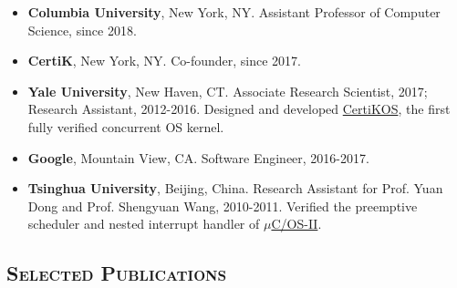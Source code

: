\documentclass[10pt]{article}
\renewcommand{\section}[1]{
	\vspace{-5pt}
   	\subsection*{\scshape  \bfseries #1}
   }
\newenvironment{innerlist}[1][\enskip\textbullet]%
        {\begin{itemize}[#1,leftmargin=25pt,parsep=0pt,itemsep=2pt,topsep=2pt,partopsep=0pt]}
        {\end{itemize}}
\newcommand\columbia{\textbf{Columbia University}}
\newcommand\yale{\textbf{Yale University}}
\newcommand\tsinghua{\textbf{Tsinghua University}}
\begin{document}
\begin{innerlist}
\item[]  \columbia{}, New York, NY. Assistant Professor of Computer Science, since 2018.

\vspace{0.05in}

\item[] \textbf{CertiK}, New York, NY. Co-founder, since 2017.

\vspace{0.05in}

\item[] \yale, New Haven, CT. Associate Research Scientist, 2017; Research Assistant, 2012-2016.
Designed and developed \href{http://flint.cs.yale.edu/certikos/}{CertiKOS}, 
the first fully verified concurrent OS kernel.

\vspace{0.05in}

\item[] \textbf{Google}, Mountain View, CA. Software Engineer, 2016-2017.

\vspace{0.05in}

\item[]  \tsinghua{}, Beijing, China. Research Assistant for Prof. Yuan Dong and Prof. Shengyuan Wang, 2010-2011. Verified the preemptive scheduler and nested interrupt handler
of \href{http://micrium.com/rtos/ucosii/overview/}{$\mu$C/OS-II}.

\end{innerlist}



\section{Selected Publications}
\end{document}
